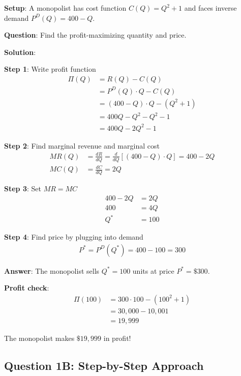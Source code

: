 \documentclass[12pt]{article}
\begin{document}
\begin{example}
\textbf{Setup}: A monopolist has cost function $C(Q) = Q^2 + 1$ and faces inverse demand $P^D(Q) = 400 - Q$.

\textbf{Question}: Find the profit-maximizing quantity and price.

\vspace{0.3cm}
\textbf{Solution}:

\textbf{Step 1}: Write profit function
\begin{align*}
\Pi(Q) &= R(Q) - C(Q) \\
&= P^D(Q) \cdot Q - C(Q) \\
&= (400 - Q) \cdot Q - (Q^2 + 1) \\
&= 400Q - Q^2 - Q^2 - 1 \\
&= 400Q - 2Q^2 - 1
\end{align*}

\textbf{Step 2}: Find marginal revenue and marginal cost
\begin{align*}
MR(Q) &= \frac{dR}{dQ} = \frac{d}{dQ}[(400-Q) \cdot Q] = 400 - 2Q \\
MC(Q) &= \frac{dC}{dQ} = 2Q
\end{align*}

\textbf{Step 3}: Set $MR = MC$
\begin{align*}
400 - 2Q &= 2Q \\
400 &= 4Q \\
Q^* &= 100
\end{align*}

\textbf{Step 4}: Find price by plugging into demand
\begin{align*}
P^* = P^D(Q^*) = 400 - 100 = 300
\end{align*}

\textbf{Answer}: The monopolist sells $Q^* = 100$ units at price $P^* = \$300$.

\vspace{0.3cm}
\textbf{Profit check}:
\begin{align*}
\Pi(100) &= 300 \cdot 100 - (100^2 + 1) \\
&= 30,000 - 10,001 \\
&= 19,999
\end{align*}

The monopolist makes $\$19,999$ in profit!
\end{example}

\newpage

\subsection{Question 1B: Step-by-Step Approach}
\end{document}
